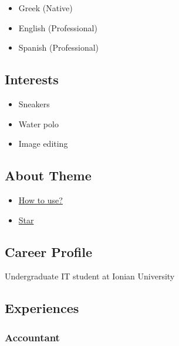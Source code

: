 \documentclass[
]{article}
\providecommand{\tightlist}{%
  \setlength{\itemsep}{0pt}\setlength{\parskip}{0pt}}
\begin{document}
\begin{itemize}
\tightlist
\item
  Greek {(Native)}
\item
  English {(Professional)}
\item
  Spanish {(Professional)}
\end{itemize}

\hypertarget{interests}{%
\subsection{Interests}\label{interests}}

\begin{itemize}
\tightlist
\item
  Sneakers
\item
  Water polo
\item
  Image editing
\end{itemize}

\hypertarget{about-theme}{%
\subsection{About Theme}\label{about-theme}}

\begin{itemize}
\tightlist
\item
  \href{https://www.youtube.com/watch?v=Jnmj1dXDbNk}{How to use?}
\item
  \href{https://github.com/sharu725/online-cv}{Star}
\end{itemize}

\hypertarget{career-profile}{%
\subsection{\texorpdfstring{{ \emph{} \emph{} } Career
Profile}{    Career Profile}}\label{career-profile}}

Undergraduate IT student at Ionian University

\hypertarget{experiences}{%
\subsection{\texorpdfstring{{ \emph{} \emph{} }
Experiences}{    Experiences}}\label{experiences}}

\hypertarget{accountant}{%
\subsubsection{Accountant}\label{accountant}}
\end{document}
